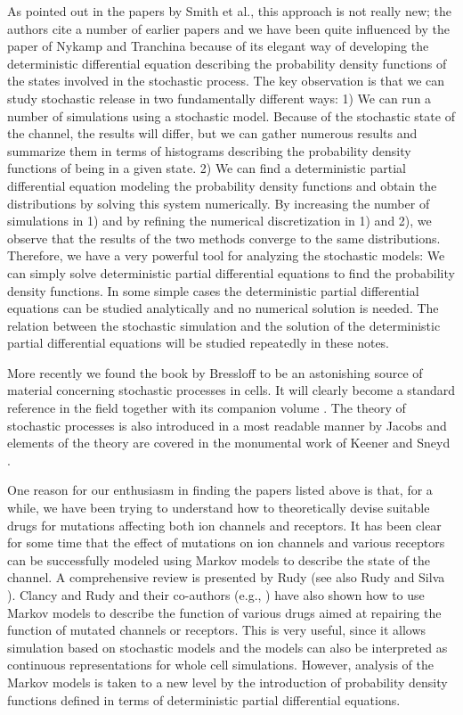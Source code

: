 As pointed out in the papers by Smith et al., this approach is not really new; the authors cite a number of earlier papers and we have been quite influenced by the paper of Nykamp and Tranchina \cite{Nykamp2000} because of its elegant way of developing the deterministic differential equation describing the probability density functions of the states involved in the stochastic process.
The key observation is that we can study stochastic release in two fundamentally different ways: 1) We can run a number of simulations using a stochastic model. Because of the stochastic state of the channel, the results will differ, but we can gather numerous results and summarize them in terms of histograms describing the probability density functions of being in a given state. 2) We can find a deterministic partial differential equation modeling the probability density functions and obtain the distributions by solving this system numerically. By increasing the number of simulations in 1) and by refining the numerical discretization in 1) and 2), we observe that the results of the two methods converge to the same distributions. Therefore, we have a very powerful tool for analyzing the stochastic models: We can simply solve deterministic partial differential equations to find the probability density functions. In some simple cases the deterministic partial differential equations can be studied analytically and no numerical solution is needed.  The relation between the stochastic simulation and the solution
of the deterministic partial differential equations will be studied repeatedly in these notes.


\bigskip
More recently we found the book by Bressloff \cite{Bressloff2014} to be an astonishing source of material concerning stochastic processes in cells. It will clearly become a standard reference in the field together with its companion volume \cite{Bressloff2014w}. The theory of stochastic processes is also introduced in a most readable manner by Jacobs \cite{Jacobs2010} and elements of the theory are covered in the monumental work of Keener and Sneyd \cite{Keener2010_I,Keener2010_II}.


\bigskip

One reason for our enthusiasm in finding the papers listed above is that, for a while, we have been trying to understand how to theoretically devise suitable drugs for mutations affecting both ion channels and receptors. It has been clear for some time that the effect of mutations on ion channels and various receptors can be successfully modeled using Markov models to describe the state of the channel. A comprehensive review is presented by Rudy \cite{Rudy2012} (see also Rudy and Silva \cite{Rudy2006}). Clancy and Rudy and their co-authors (e.g., \cite{Clancy2007}) have also shown how to use Markov models to describe the function of various drugs aimed at repairing the function of mutated channels or receptors. This is very useful, since it allows simulation based on stochastic models and the models can also be interpreted as continuous representations for whole cell simulations. However, analysis of the Markov models is taken to a new level by the introduction of probability density functions defined in terms of deterministic partial differential equations.

